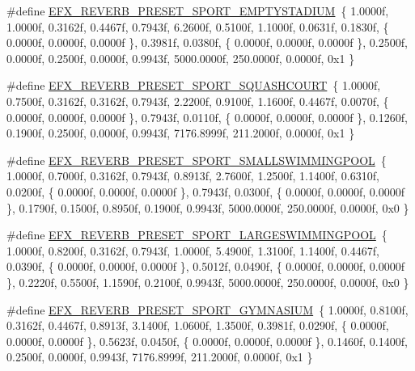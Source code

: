 \begin{DoxyCompactItemize}
\item 
\#define \mbox{\hyperlink{efx-presets_8h_a568154406051fd0d23820deac501404a}{E\+F\+X\+\_\+\+R\+E\+V\+E\+R\+B\+\_\+\+P\+R\+E\+S\+E\+T\+\_\+\+S\+P\+O\+R\+T\+\_\+\+E\+M\+P\+T\+Y\+S\+T\+A\+D\+I\+UM}}~\{ 1.\+0000f, 1.\+0000f, 0.\+3162f, 0.\+4467f, 0.\+7943f, 6.\+2600f, 0.\+5100f, 1.\+1000f, 0.\+0631f, 0.\+1830f, \{ 0.\+0000f, 0.\+0000f, 0.\+0000f \}, 0.\+3981f, 0.\+0380f, \{ 0.\+0000f, 0.\+0000f, 0.\+0000f \}, 0.\+2500f, 0.\+0000f, 0.\+2500f, 0.\+0000f, 0.\+9943f, 5000.\+0000f, 250.\+0000f, 0.\+0000f, 0x1 \}
\item 
\#define \mbox{\hyperlink{efx-presets_8h_a25bb269e5c8e3bed033ba116fb4990e8}{E\+F\+X\+\_\+\+R\+E\+V\+E\+R\+B\+\_\+\+P\+R\+E\+S\+E\+T\+\_\+\+S\+P\+O\+R\+T\+\_\+\+S\+Q\+U\+A\+S\+H\+C\+O\+U\+RT}}~\{ 1.\+0000f, 0.\+7500f, 0.\+3162f, 0.\+3162f, 0.\+7943f, 2.\+2200f, 0.\+9100f, 1.\+1600f, 0.\+4467f, 0.\+0070f, \{ 0.\+0000f, 0.\+0000f, 0.\+0000f \}, 0.\+7943f, 0.\+0110f, \{ 0.\+0000f, 0.\+0000f, 0.\+0000f \}, 0.\+1260f, 0.\+1900f, 0.\+2500f, 0.\+0000f, 0.\+9943f, 7176.\+8999f, 211.\+2000f, 0.\+0000f, 0x1 \}
\item 
\#define \mbox{\hyperlink{efx-presets_8h_a3868b5003b7826a394a567e55dbf6c3d}{E\+F\+X\+\_\+\+R\+E\+V\+E\+R\+B\+\_\+\+P\+R\+E\+S\+E\+T\+\_\+\+S\+P\+O\+R\+T\+\_\+\+S\+M\+A\+L\+L\+S\+W\+I\+M\+M\+I\+N\+G\+P\+O\+OL}}~\{ 1.\+0000f, 0.\+7000f, 0.\+3162f, 0.\+7943f, 0.\+8913f, 2.\+7600f, 1.\+2500f, 1.\+1400f, 0.\+6310f, 0.\+0200f, \{ 0.\+0000f, 0.\+0000f, 0.\+0000f \}, 0.\+7943f, 0.\+0300f, \{ 0.\+0000f, 0.\+0000f, 0.\+0000f \}, 0.\+1790f, 0.\+1500f, 0.\+8950f, 0.\+1900f, 0.\+9943f, 5000.\+0000f, 250.\+0000f, 0.\+0000f, 0x0 \}
\item 
\#define \mbox{\hyperlink{efx-presets_8h_ab18c0d7695c7cbcb5b240c2564c20edd}{E\+F\+X\+\_\+\+R\+E\+V\+E\+R\+B\+\_\+\+P\+R\+E\+S\+E\+T\+\_\+\+S\+P\+O\+R\+T\+\_\+\+L\+A\+R\+G\+E\+S\+W\+I\+M\+M\+I\+N\+G\+P\+O\+OL}}~\{ 1.\+0000f, 0.\+8200f, 0.\+3162f, 0.\+7943f, 1.\+0000f, 5.\+4900f, 1.\+3100f, 1.\+1400f, 0.\+4467f, 0.\+0390f, \{ 0.\+0000f, 0.\+0000f, 0.\+0000f \}, 0.\+5012f, 0.\+0490f, \{ 0.\+0000f, 0.\+0000f, 0.\+0000f \}, 0.\+2220f, 0.\+5500f, 1.\+1590f, 0.\+2100f, 0.\+9943f, 5000.\+0000f, 250.\+0000f, 0.\+0000f, 0x0 \}
\item 
\#define \mbox{\hyperlink{efx-presets_8h_a769afdf3f0cf5ddf3b44b336c6940950}{E\+F\+X\+\_\+\+R\+E\+V\+E\+R\+B\+\_\+\+P\+R\+E\+S\+E\+T\+\_\+\+S\+P\+O\+R\+T\+\_\+\+G\+Y\+M\+N\+A\+S\+I\+UM}}~\{ 1.\+0000f, 0.\+8100f, 0.\+3162f, 0.\+4467f, 0.\+8913f, 3.\+1400f, 1.\+0600f, 1.\+3500f, 0.\+3981f, 0.\+0290f, \{ 0.\+0000f, 0.\+0000f, 0.\+0000f \}, 0.\+5623f, 0.\+0450f, \{ 0.\+0000f, 0.\+0000f, 0.\+0000f \}, 0.\+1460f, 0.\+1400f, 0.\+2500f, 0.\+0000f, 0.\+9943f, 7176.\+8999f, 211.\+2000f, 0.\+0000f, 0x1 \}

\end{DoxyCompactItemize}
